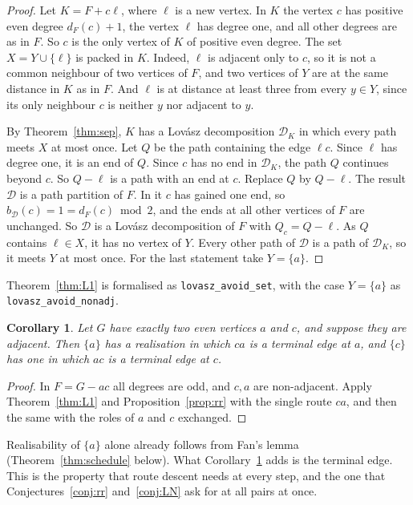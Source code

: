 \documentclass[11pt]{amsart}
\newtheorem{corollary}[theorem]{Corollary}
\theoremstyle{definition}
\newcommand{\cD}{\mathcal D}
\begin{document}
\begin{proof}
Let $K=F+c\ell$, where $\ell$ is a new vertex. In $K$ the vertex $c$ has positive even degree
$d_F(c)+1$, the vertex $\ell$ has degree one, and all other degrees are as in $F$. So $c$ is the only
vertex of $K$ of positive even degree. The set $X=Y\cup\{\ell\}$ is packed in $K$. Indeed, $\ell$ is
adjacent only to $c$, so it is not a common neighbour of two vertices of $F$, and two vertices of $Y$
are at the same distance in $K$ as in $F$. And $\ell$ is at distance at least three from every
$y\in Y$, since its only neighbour $c$ is neither $y$ nor adjacent to $y$.

By Theorem~\ref{thm:sep}, $K$ has a Lov\'asz decomposition $\cD_K$ in which every path meets $X$ at
most once. Let $Q$ be the path containing the edge $\ell c$. Since $\ell$ has degree one, it is an end
of $Q$. Since $c$ has no end in $\cD_K$, the path $Q$ continues beyond $c$. So $Q-\ell$ is a path with an
end at $c$. Replace $Q$ by $Q-\ell$. The result $\cD$ is a path partition of $F$. In it $c$ has gained
one end, so $b_\cD(c)=1=d_F(c)\bmod2$, and the ends at all other vertices of $F$ are unchanged. So $\cD$
is a Lov\'asz decomposition of $F$ with $Q_c=Q-\ell$. As $Q$ contains $\ell\in X$, it has no vertex of $Y$.
Every other path of $\cD$ is a path of $\cD_K$, so it meets $Y$ at most once. For the last statement
take $Y=\{a\}$.
\end{proof}

Theorem~\ref{thm:L1} is formalised as \texttt{lovasz\_avoid\_set}, with the case $Y=\{a\}$ as
\texttt{lovasz\_avoid\_nonadj}.

\begin{corollary}\label{cor:onepair}
Let $G$ have exactly two even vertices $a$ and $c$, and suppose they are adjacent. Then $\{a\}$ has a
realisation in which $ca$ is a terminal edge at $a$, and $\{c\}$ has one in which $ac$ is a terminal
edge at $c$.
\end{corollary}

\begin{proof}
In $F=G-ac$ all degrees are odd, and $c,a$ are non-adjacent. Apply Theorem~\ref{thm:L1} and
Proposition~\ref{prop:rr} with the single route $ca$, and then the same with the roles of $a$ and $c$
exchanged.
\end{proof}

Realisability of $\{a\}$ alone already follows from Fan's lemma (Theorem~\ref{thm:schedule} below). What
Corollary~\ref{cor:onepair} adds is the terminal edge. This is the property that route descent needs
at every step, and the one that Conjectures~\ref{conj:rr} and~\ref{conj:LN} ask for at all pairs at
once.
\end{document}
